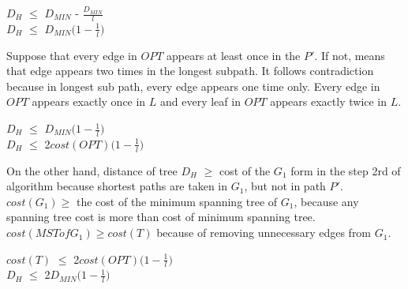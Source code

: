 \begin{center}
 
  $D_H$ $\leq$ $D_{MIN}$ - $\frac{D_{MIN}}{l}$\\
  $D_H$  $\leq$ $D_{MIN}\Big(1- \frac{1}{l} \Big)$ \\

\end{center}
 
 Suppose that every edge in $OPT$ appears at least once in the $P'$. If not, means that edge appears two times in the longest subpath. It follows contradiction because in longest sub path, every edge appears one time only.
 Every edge in $OPT$ appears exactly once in $L$ and every leaf in $OPT$ appears exactly twice in $L$.


 \begin{center}
 $D_H$  $\leq$ $D_{MIN}\Big(1- \frac{1}{l} \Big)$\\
 $D_H$  $\leq$ 2$cost(OPT)\Big(1- \frac{1}{l} \Big)$
 \end{center}

On the other hand, distance of tree  $D_H$ $\geq$ cost of the $G_1$ form in the step 2rd of algorithm because shortest paths are taken in $G_1$, but not in path $P'$. $cost(G_1) \geq$ the cost of the minimum spanning tree of $G_1$, because any spanning tree cost is more than cost of minimum spanning tree. $cost(MST of G_1) \geq cost(T)$ because of removing unnecessary edges from $G_1$. 
 
 \begin{center}
 $cost(T)$  $\leq$ 2$cost(OPT)\Big(1- \frac{1}{l} \Big)$\\
 $D_H$  $\leq$ 2$D_{MIN}\Big(1- \frac{1}{l} \Big)$

 \end{center} 


